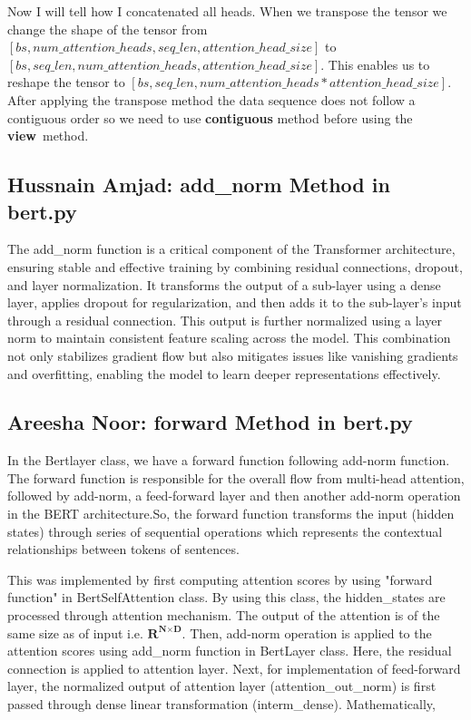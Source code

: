 \documentclass{article}
\begin{document}
Now I will tell how I concatenated all heads. When we transpose the tensor we change the shape of the tensor from \( [bs,num\_attention\_heads,seq\_len,attention\_head\_size] \) to \( [bs,seq\_len,num\_attention\_heads,attention\_head\_size] \). This enables us to reshape the tensor to \( [bs,seq\_len,num\_attention\_heads*attention\_head\_size] \). After applying the transpose method the data sequence does not follow a contiguous order so we need to use \textbf{contiguous} method before using the \textbf{view}\ method.

\subsection{Hussnain Amjad: add\_norm Method in bert.py}
The add\_norm function is a critical component of the Transformer architecture, ensuring stable and effective training by combining residual connections, dropout, and layer normalization. It transforms the output of a sub-layer using a dense layer, applies dropout for regularization, and then adds it to the sub-layer's input through a residual connection. This output is further normalized using a layer norm to maintain consistent feature scaling across the model. This combination not only stabilizes gradient flow but also mitigates issues like vanishing gradients and overfitting, enabling the model to learn deeper representations effectively.

\subsection{Areesha Noor: forward Method in bert.py}
In the Bertlayer class, we have a forward function following add-norm function. The forward function is responsible for the overall flow from multi-head attention, followed by add-norm, a  feed-forward layer and then another add-norm operation in the BERT architecture.So, the forward function transforms the input (hidden states) through series of sequential operations which represents the contextual relationships between tokens of sentences.

This was implemented by first computing attention scores by using "forward function" in  BertSelfAttention class. By using this class, the hidden\_states are processed through attention mechanism. The output of the attention is of the same size as of input i.e.  $\textbf{R}^{\textbf{N} \times \textbf{D}}$. Then, add-norm operation is applied to the attention scores using add\_norm function in BertLayer class. Here, the residual connection is applied to attention layer. Next, for implementation of feed-forward layer, the normalized output of attention layer (attention\_out\_norm) is first passed through dense linear transformation (interm\_dense). Mathematically, 
\end{document}
